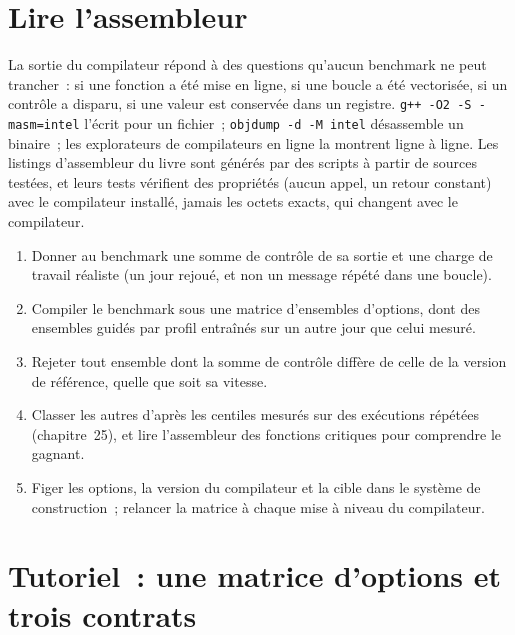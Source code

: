 \section{Lire l'assembleur}

La sortie du compilateur répond à des questions qu'aucun benchmark ne peut trancher~: si une fonction a été mise en ligne, si une boucle a été vectorisée,
si un contrôle a disparu, si une valeur est conservée dans un registre. \texttt{g++ -O2 -S -masm=intel} l'écrit pour un fichier~;
\texttt{objdump -d -M intel} désassemble un binaire~; les explorateurs de compilateurs en ligne la montrent ligne à ligne. Les listings d'assembleur du livre sont
générés par des scripts à partir de sources testées, et leurs tests vérifient des propriétés (aucun appel, un retour constant) avec le compilateur installé,
jamais les octets exacts, qui changent avec le compilateur.

\begin{method}\label{met:ll:cpp-for-latency-iii-the-compiler:flags}
\begin{enumerate}
\item Donner au benchmark une somme de contrôle de sa sortie et une charge de travail réaliste (un jour rejoué, et non un message répété dans une boucle).
\item Compiler le benchmark sous une matrice d'ensembles d'options, dont des ensembles guidés par profil entraînés sur un autre jour que celui mesuré.
\item Rejeter tout ensemble dont la somme de contrôle diffère de celle de la version de référence, quelle que soit sa vitesse.
\item Classer les autres d'après les centiles mesurés sur des exécutions répétées (chapitre~25), et lire l'assembleur des fonctions
critiques pour comprendre le gagnant.
\item Figer les options, la version du compilateur et la cible dans le système de construction~; relancer la matrice à chaque mise à niveau du compilateur.
\end{enumerate}
\end{method}

\section{Tutoriel~: une matrice d'options et trois contrats}\label{tut:ll:cpp-for-latency-iii-the-compiler:tut}

